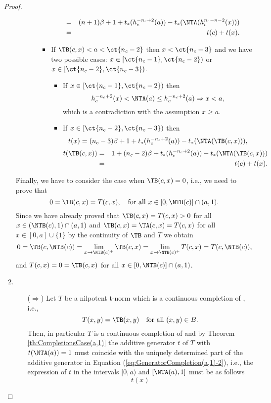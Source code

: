 \begin{proof}
\begin{enumerate}[label=(\roman*)]
\begin{itemize}
\begin{itemize}
\begin{itemize}
\begin{eqnarray*}
						&=&  (n+1)\beta+1+t_*(h_c^{-n_c+2}(a)) - t_*(\NTA(h_c^{n_c-n-2}(x)))\\
						&=& t(c)+t(x).
					\end{eqnarray*}
					\item If $\TB(c,x) < a < \ct{n_c-2}$ then $x < \ct{n_c-3}$ and we have two possible cases: $x \in [\ct{n_c-1},\ct{n_c-2})$ or $x \in [\ct{n_c-2},\ct{n_c-3})$.
					\begin{itemize}
						\item If $x \in [\ct{n_c-1},\ct{n_c-2})$ then
						$$h_c^{-n_c+2}(x) < \NTA(a) \leq h_c^{-n_c+2}(a) \Rightarrow x<a,$$
						which is a contradiction with the assumption $x \geq a$.
						\item If $x \in [\ct{n_c-2},\ct{n_c-3})$ then
						$$t(x)=(n_c-3)\beta+1+t_*(h_c^{-n_c+2}(a))-t_*(\NTA(\TB(c,x))),$$
						\begin{eqnarray*}
						t(\TB(c,x)) & = & 1 + (n_c-2)\beta+t_*(h_c^{-n_c+2}(a))-t_*(\NTA(\TB(c,x)))\\
						& = & t(c)+t(x).
						\end{eqnarray*}
					\end{itemize}
				\end{itemize}
			\end{itemize}
		\end{itemize}
		Finally, we have to consider the case when $\TB(c,x)=0$, i.e., we need to prove that
		$$0=\TB(c,x)=T(c,x), \quad \text{for all } x \in [0,\NTB(c)] \cap (a,1).$$
		Since we have already proved that $\TB(c,x)=T(c,x)>0$ for all $x \in (\NTB(c),1) \cap (a,1)$ and $\TB(c,x)=\TA(c,x)=T(c,x)$ for all $x \in [0,a] \cup \{1\}$ by the continuity of $\TB$ and $T$ we obtain
		$$0 = \TB(c,\NTB(c)) = \lim_{x \to \NTB(c)^{+}} \TB(c,x) = \lim_{x \to \NTB(c)^{+}} T(c,x) = T(c,\NTB(c)),$$
		and $T(c,x)=0=\TB(c,x)$ for all $x \in [0,\NTB(c)] \cap (a,1)$.
		\item  \begin{itemize}
			\item[($\Rightarrow$)] Let $T$ be a nilpotent t-norm which is a continuous completion of \TB, i.e.,
			$$T(x,y)=\TB(x,y) \quad \text{for all } (x,y) \in B.$$
			Then, in particular $T$ is a continuous completion of \TA and by Theorem \ref{th:CompletionsCase(a,1)} the additive generator $t$ of $T$ with $t(\NTA(a))=1$ must coincide with the uniquely determined part of the additive generator in Equation (\ref{eq:GeneratorCompletion(a,1)-2}), i.e., the expression of $t$ in the intervals $[0,a)$ and $[\NTA(a),1]$ must be as follows
			$$
			t(x)
$$
\end{itemize}
\end{enumerate}
\end{proof}
